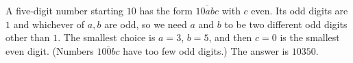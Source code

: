 A five-digit number starting $10$ has the form $\overline{10abc}$ with $c$ even. Its odd digits are $1$ and whichever of $a,b$ are odd, so we need $a$ and $b$ to be two different odd digits other than $1$. The smallest choice is $a=3$, $b=5$, and then $c=0$ is the smallest even digit. (Numbers $\overline{100bc}$ have too few odd digits.) The answer is $\boxed{10350}$.
